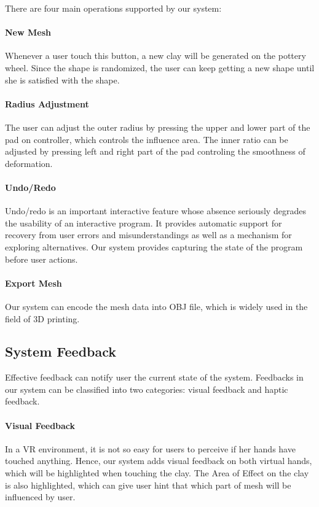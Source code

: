 
There are four main operations supported by our system:

\paragraph{New Mesh}
Whenever a user touch this button, a new clay will be generated on the pottery wheel. Since the shape is randomized, the user can keep getting a new shape until she is satisfied with the shape.

\paragraph{Radius Adjustment}
The user can adjust the outer radius by pressing the upper and lower part of the pad on controller, which controls the influence area. The inner ratio can be adjusted by pressing left and right part of the pad controling the smoothness of deformation.


\paragraph{Undo/Redo}
Undo/redo is an important interactive feature whose absence seriously degrades the usability of an interactive program.\cite{choudhary1995general} It provides automatic support for recovery from user errors and misunderstandings as well as a mechanism for exploring alternatives. Our system provides capturing the state of the program before user actions.

\paragraph{Export Mesh}
Our system can encode the mesh data into OBJ file, which is widely used in the field of 3D printing.

\subsection{System Feedback}
\label{sec:4.4}
Effective feedback can notify user the current state of the system. Feedbacks in our system can be classified into two categories: visual feedback and haptic feedback.
\paragraph{Visual Feedback}
In a VR environment, it is not so easy for users to perceive if her hands have touched anything. Hence, our system adds visual feedback on both virtual hands, which will be highlighted when touching the clay. The Area of Effect on the clay is also highlighted, which can give user hint that which part of mesh will be influenced by user.
